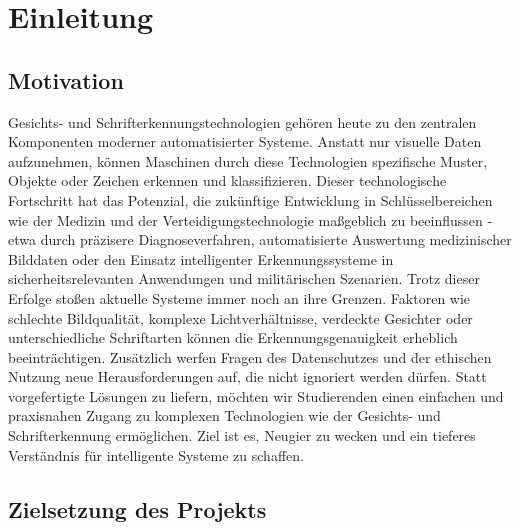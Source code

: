 \section{Einleitung}
\subsection{Motivation}
Gesichts- und Schrifterkennungstechnologien gehören heute zu den zentralen Komponenten moderner automatisierter Systeme. Anstatt nur visuelle Daten aufzunehmen, können Maschinen durch diese Technologien spezifische Muster, Objekte oder Zeichen erkennen und klassifizieren. Dieser technologische Fortschritt hat das Potenzial, die zukünftige Entwicklung in Schlüsselbereichen wie der Medizin und der Verteidigungstechnologie maßgeblich zu beeinflussen - etwa durch präzisere Diagnoseverfahren, automatisierte Auswertung medizinischer Bilddaten oder den Einsatz intelligenter Erkennungssysteme in sicherheitsrelevanten Anwendungen und militärischen Szenarien. 
Trotz dieser Erfolge stoßen aktuelle Systeme immer noch an ihre Grenzen. Faktoren wie schlechte Bildqualität, komplexe Lichtverhältnisse, verdeckte Gesichter oder unterschiedliche Schriftarten können die Erkennungsgenauigkeit erheblich beeinträchtigen. Zusätzlich werfen Fragen des Datenschutzes und der ethischen Nutzung neue Herausforderungen auf, die nicht ignoriert werden dürfen. Statt vorgefertigte Lösungen zu liefern, möchten wir Studierenden einen einfachen und praxisnahen Zugang zu komplexen Technologien wie der Gesichts- und Schrifterkennung ermöglichen. Ziel ist es, Neugier zu wecken und ein tieferes Verständnis für intelligente Systeme zu schaffen. 
\subsection{Zielsetzung des Projekts} 
